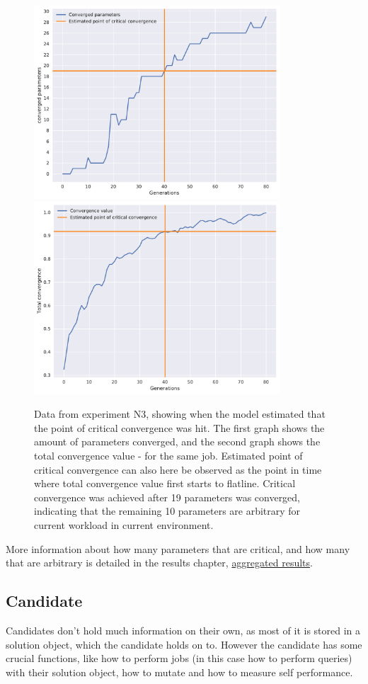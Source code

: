 \documentclass[a4paper,english]{report}
\begin{document}
		\begin{figure}[H]
			\centering
			\includegraphics[width=260pt]{est21}
			\includegraphics[width=260pt]{est22}
			\caption{Data from experiment N3, showing when the model estimated that the point of critical convergence was hit. The first graph shows the amount of parameters converged, and the second graph shows the total convergence value - for the same job. Estimated point of critical convergence can also here be observed as the point in time where total convergence value first starts to flatline. Critical convergence was achieved after 19 parameters was converged, indicating that the remaining 10 parameters are arbitrary for current workload in current environment.}
			\label{fig:estimation2}
		\end{figure}
		More information about how many parameters that are critical, and how many that are arbitrary is detailed in the results chapter, \hyperref[sec:aggres]{aggregated results}.
		\clearpage
		\subsection{Candidate}
		Candidates don't hold much information on their own, as most of it is stored in a solution object, which the candidate holds on to. However the candidate has some crucial functions, like how to perform jobs (in this case how to perform queries) with their solution object, how to mutate and how to measure self performance.
\end{document}
